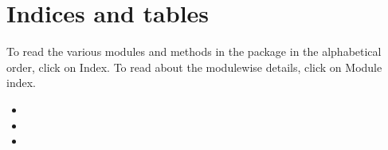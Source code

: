 \documentclass[letterpaper,10pt,english]{sphinxmanual}
\begin{document}
\chapter{Indices and tables}
\label{\detokenize{index:indices-and-tables}}
\sphinxAtStartPar
To read the various modules and methods in the package in the alphabetical order, click on Index. To read about the module\sphinxhyphen{}wise
details, click on Module index.
\begin{itemize}
\item {} 
\sphinxAtStartPar
{}

\item {} 
\sphinxAtStartPar
{}

\item {} 
\sphinxAtStartPar
{}

\end{itemize}
\end{document}
